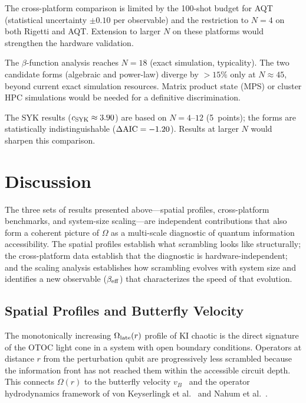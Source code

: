 \documentclass[twocolumn,showpacs,preprintnumbers,amsmath,amssymb,aps,prl]{revtex4-2}
\begin{document}
The cross-platform comparison is limited by the 100-shot budget for AQT
(statistical uncertainty $\pm 0.10$ per observable) and the restriction to $N=4$
on both Rigetti and AQT. Extension to larger $N$ on these platforms would
strengthen the hardware validation.

The $\beta$-function analysis reaches $N=18$ (exact simulation, typicality). The
two candidate forms (algebraic and power-law) diverge by $> 15\%$ only at
$N \approx 45$, beyond current exact simulation resources. Matrix product state
(MPS) or cluster HPC simulations would be needed for a definitive discrimination.

The SYK results ($c_{\rm SYK} \approx 3.90$) are based on $N = 4$--$12$
(5~points); the forms are statistically indistinguishable ($\Delta{\rm AIC}
= -1.20$). Results at larger $N$ would sharpen this comparison.

\section{Discussion}

The three sets of results presented above---spatial profiles, cross-platform
benchmarks, and system-size scaling---are independent contributions that also
form a coherent picture of $\Omega$ as a multi-scale diagnostic of quantum
information accessibility. The spatial profiles establish what scrambling looks
like structurally; the cross-platform data establish that the diagnostic is
hardware-independent; and the scaling analysis establishes how scrambling evolves
with system size and identifies a new observable ($\beta_{\rm eff}$) that
characterizes the speed of that evolution.

\subsection{Spatial Profiles and Butterfly Velocity}

The monotonically increasing $\Omega_{\rm late}(r)$ profile of KI chaotic is the
direct signature of the OTOC light cone in a system with open boundary conditions.
Operators at distance $r$ from the perturbation qubit are progressively less
scrambled because the information front has not reached them within the accessible
circuit depth. This connects $\Omega(r)$ to the butterfly velocity
$v_B$~\cite{vonKeyserlingk2018} and the operator hydrodynamics framework of von
Keyserlingk et al.~\cite{vonKeyserlingk2018} and Nahum et
al.~\cite{NahumVijayHaah2018}.
\end{document}
